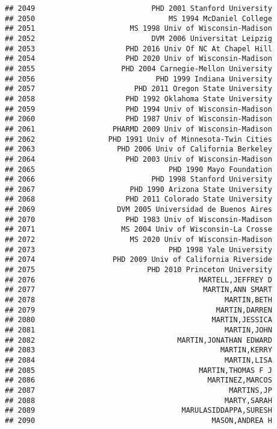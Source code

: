 \documentclass[
]{article}
\begin{document}
\begin{verbatim}
## 2049                           PHD 2001 Stanford University
## 2050                               MS 1994 McDaniel College
## 2051                      MS 1998 Univ of Wisconsin-Madison
## 2052                           DVM 2006 Universitat Leipzig
## 2053                     PHD 2016 Univ Of NC At Chapel Hill
## 2054                     PHD 2020 Univ of Wisconsin-Madison
## 2055                    PHD 2004 Carnegie-Mellon University
## 2056                            PHD 1999 Indiana University
## 2057                       PHD 2011 Oregon State University
## 2058                     PHD 1992 Oklahoma State University
## 2059                     PHD 1994 Univ of Wisconsin-Madison
## 2060                     PHD 1987 Univ of Wisconsin-Madison
## 2061                  PHARMD 2009 Univ of Wisconsin-Madison
## 2062                 PHD 1991 Univ of Minnesota-Twin Cities
## 2063                   PHD 2006 Univ of California Berkeley
## 2064                     PHD 2003 Univ of Wisconsin-Madison
## 2065                               PHD 1990 Mayo Foundation
## 2066                           PHD 1998 Stanford University
## 2067                      PHD 1990 Arizona State University
## 2068                     PHD 2011 Colorado State University
## 2069                   DVM 2005 Universidad de Buenos Aires
## 2070                     PHD 1983 Univ of Wisconsin-Madison
## 2071                    MS 2004 Univ of Wisconsin-La Crosse
## 2072                      MS 2020 Univ of Wisconsin-Madison
## 2073                               PHD 1998 Yale University
## 2074                  PHD 2009 Univ of California Riverside
## 2075                          PHD 2010 Princeton University
## 2076                                      MARTELL,JEFFREY D
## 2077                                       MARTIN,ANN SMART
## 2078                                            MARTIN,BETH
## 2079                                          MARTIN,DARREN
## 2080                                         MARTIN,JESSICA
## 2081                                            MARTIN,JOHN
## 2082                                 MARTIN,JONATHAN EDWARD
## 2083                                           MARTIN,KERRY
## 2084                                            MARTIN,LISA
## 2085                                      MARTIN,THOMAS F J
## 2086                                        MARTINEZ,MARCOS
## 2087                                             MARTINS,JP
## 2088                                            MARTY,SARAH
## 2089                                  MARULASIDDAPPA,SURESH
## 2090                                         MASON,ANDREA H

\end{verbatim}
\end{document}
